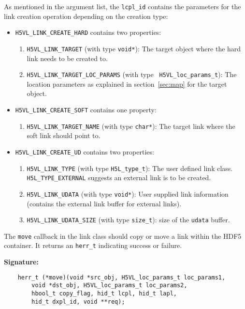 As mentioned in the argument list, the {\tt lcpl\_id} contains the
parameters for the link creation operation depending on the creation
type:
\begin{itemize}
\item {\tt H5VL\_LINK\_CREATE\_HARD} contains two properties:
  \begin{enumerate}
  \item {\tt H5VL\_LINK\_TARGET} (with type {\tt void*}): The target
    object where the hard link needs to be created to.
  \item {\tt H5VL\_LINK\_TARGET\_LOC\_PARAMS} (with type {\tt
      H5VL\_loc\_params\_t}): The location parameters as explained in
    section~\ref{sec:map} for the target object.
  \end{enumerate}

\item {\tt H5VL\_LINK\_CREATE\_SOFT} contains one property:
  \begin{enumerate}
  \item {\tt H5VL\_LINK\_TARGET\_NAME} (with type {\tt char*}): The target
    link where the soft link should point to.
  \end{enumerate}

\item {\tt H5VL\_LINK\_CREATE\_UD} contains two properties:
  \begin{enumerate}
  \item {\tt H5VL\_LINK\_TYPE} (with type {\tt H5L\_type\_t}): The
    user defined link class. {\tt H5L\_TYPE\_EXTERNAL} suggests an
    external link is to be created.
  \item {\tt H5VL\_LINK\_UDATA} (with type {\tt void*}): User supplied
    link information (contains the external link buffer for external
    links). 
  \item {\tt H5VL\_LINK\_UDATA\_SIZE} (with type {\tt size\_t}): size
    of the {\tt udata} buffer. 
  \end{enumerate}
\end{itemize}

The {\tt move} callback in the link class should copy or move a link
within the HDF5 container. It returns an {\tt herr\_t} indicating
success or failure.

\textbf{Signature:}
\begin{lstlisting}
    herr_t (*move)(void *src_obj, H5VL_loc_params_t loc_params1,
        void *dst_obj, H5VL_loc_params_t loc_params2,
        hbool_t copy_flag, hid_t lcpl, hid_t lapl, 
        hid_t dxpl_id, void **req);
\end{lstlisting}

